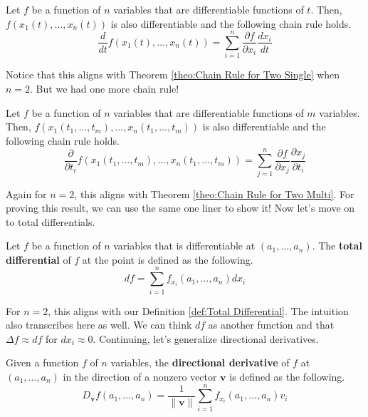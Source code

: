 \documentclass[../../../main.tex]{subfiles}
\begin{document}
\begin{theorem}{}{}
Let $f$ be a function of $n$ variables that are differentiable
functions of $t$. Then, $f(x_1(t), \ldots, x_n(t))$ is also
differentiable and the following chain rule holds.
\[
\frac{d}{dt} f(x_1(t), \ldots, x_n(t))
= \sum_{i=1}^n \frac{\partial f}{\partial x_i} \frac{dx_i}{dt}
\]
\end{theorem}

Notice that this aligns with Theorem \ref{theo:Chain Rule for Two
Single} when $n = 2$. But we had one more chain rule!

\begin{theorem}{}{}
Let $f$ be a function of $n$ variables that are differentiable
functions of $m$ variables. Then, $f(x_1(t_1, \ldots, t_m), \ldots,
x_n(t_1, \ldots, t_m))$ is also differentiable and the following
chain rule holds.
\vspace{-0.6\baselineskip}
\[
\frac{\partial}{\partial t_i}
    f(x_1(t_1, \ldots, t_m), \ldots, x_n(t_1, \ldots, t_m))
= \sum_{j=1}^n
    \frac{\partial f}{\partial x_j} \frac{\partial x_j}{\partial t_i}
\]
\end{theorem}

Again for $n = 2$, this aligns with Theorem \ref{theo:Chain Rule for
Two Multi}. For proving this result, we can use the same one liner
to show it! Now let's move on to total differentials.

\begin{definition}{}{}
Let $f$ be a function of $n$ variables that is differentiable at
$(a_1, \ldots, a_n)$. The \textbf{total differential} of $f$ at the
point is defined as the following.
\vspace{-0.8\baselineskip}
\[
df = \sum_{i=1}^n f_{x_i}(a_1, \ldots, a_n) dx_i
\]
\end{definition}

For $n = 2$, this aligns with our Definition \ref{def:Total
Differential}. The intuition also transcribes here as well. We can
think $df$ as another function and that $\Delta f \approx df$ for
$dx_i \approx 0$. Continuing, let's generalize directional
derivatives.

\begin{definition}{}{}
Given a function $f$ of $n$ variables, the \textbf{directional
derivative} of $f$ at $(a_1, \ldots, a_n)$ in the direction of
a nonzero vector $\mathbf{v}$ is defined as the following.
\[
D_\mathbf{v} f(a_1, \ldots, a_n)
= \frac{1}{\| \mathbf{v} \|}
    \sum_{i=1}^n f_{x_i} (a_1, \ldots, a_n) v_i
\]
\end{definition}
\end{document}
